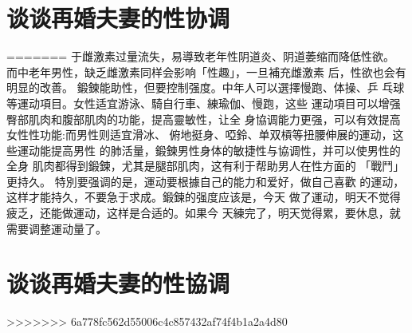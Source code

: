 \documentclass[12pt,UTF8]{ctexbook}
\begin{document}
\section{谈谈再婚夫妻的性协调}
=======
于雌激素过量流失，易導致老年性阴道炎、阴道萎缩而降低性欲。
而中老年男性，缺乏雌激素同样会影响「性趣」，一旦補充雌激素
后，性欲也会有明显的改善。
鍛鍊能助性，但要控制强度。中年人可以選擇慢跑、体操、乒
乓球等運动項目。女性适宜游泳、騎自行車、練瑜伽、慢跑，这些
運动項目可以增强臀部肌肉和腹部肌肉的功能，提高靈敏性，让全
身協调能力更强，可以有效提高女性性功能:而男性则适宜滑冰、
俯地挺身、啞鈴、单双槓等扭腰伸展的運动，这些運动能提高男性
的肺活量，鍛鍊男性身体的敏捷性与協调性，并可以使男性的全身
肌肉都得到鍛鍊，尤其是腿部肌肉，这有利于帮助男人在性方面的
「戰鬥」更持久。
特別要强调的是，運动要根據自己的能力和爱好，做自己喜歡
的運动，这样才能持久，不要急于求成。鍛鍊的强度应该是，今天
做了運动，明天不觉得疲乏，还能做運动，这样是合适的。如果今
天練完了，明天觉得累，要休息，就需要调整運动量了。

\section{谈谈再婚夫妻的性協调}
>>>>>>> 6a778fc562d55006c4c857432af74f4b1a2a4d80
\end{document}
